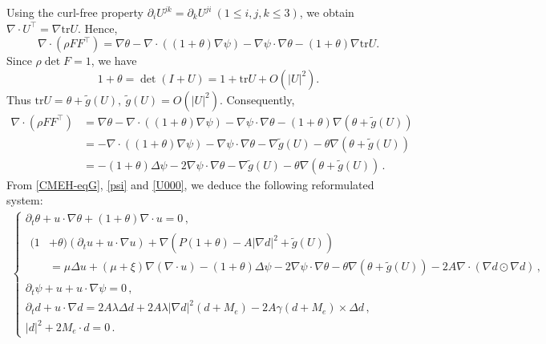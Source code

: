 \documentclass[reqno,11pt]{amsart}
\numberwithin{equation}{section}
\def\p{\partial}
\begin{document}
Using the curl-free property $\p_i U^{jk} = \p_k U^{ji} \ (1\leq i,j,k\leq3)$, we obtain $\nabla \cdot U^\top=\nabla \mathrm{tr} U.$ Hence,
$$\nabla \cdot(\rho FF^\top)=\nabla \theta-\nabla\cdot((1+\theta)\nabla \psi)-\nabla\psi\cdot\nabla\theta-(1+\theta)\nabla \mathrm{tr} U.$$
Since $\rho \det F=1$, we have
$$ 1 + \theta = \det ( I + U ) = 1 + \mathrm{tr} U + O ( |U|^2 ) .$$
Thus $\mathrm{tr} U= \theta + \tilde{g} (U), \ \tilde{g}(U) = O(|U|^2) $. Consequently,
\begin{equation}\label{U000}
\begin{aligned}
\nabla \cdot ( \rho F F^\top ) & = \nabla \theta - \nabla \cdot \left((1+\theta)\nabla \psi\right) - \nabla \psi \cdot \nabla \theta - (1+\theta)\nabla\left(\theta + \tilde{g}(U)\right) \\
& = -\nabla \cdot \left((1+\theta)\nabla \psi\right) - \nabla \psi \cdot \nabla \theta - \nabla \tilde{g}(U)  - \theta \nabla\left(\theta + \tilde{g}(U)\right) \\
& = -(1+\theta)\Delta \psi - 2\nabla \psi \cdot \nabla \theta - \nabla \tilde{g}(U)- \theta \nabla\left(\theta + \tilde{g}(U)\right)\,.
\end{aligned}
\end{equation}
From \eqref{CMEH-eqG}, \eqref{psi} and \eqref{U000}, we deduce the following reformulated system:                   
\begin{align}\label{CMEH-eqGd}
	\begin{cases}
		\p_t \theta +u\cdot\nabla\theta+(1+\theta)\nabla\cdot u = 0 \,, \\
		\begin{aligned}
			(1&+\theta)(\p_t u+u\cdot\nabla u) + \nabla \left( P(1+\theta) - A |\nabla d|^2 +\tilde{g}(U)\right) 
			\\[5pt] & 
			=  \mu\Delta u+(\mu+\xi)\nabla(\nabla \cdot u)-(1+\theta)\Delta\psi-2\nabla\psi\cdot\nabla\theta-\theta\nabla(\theta+\tilde{g}(U))-2A \nabla \cdot ( \nabla d \odot \nabla d)  \,, 
		\end{aligned} \\
		\partial_t \psi + u+u\cdot\nabla \psi =0 \,, \\
		\p_t d + u\cdot \nabla d = 2A\lambda \Delta d+2A\lambda|\nabla d|^2(d+M_e)-2A\gamma(d+M_e)\times \Delta d
		\,, \\ 
	|d|^2+2M_e\cdot d=0 \,. 
	\end{cases}
\end{align}
\end{document}
